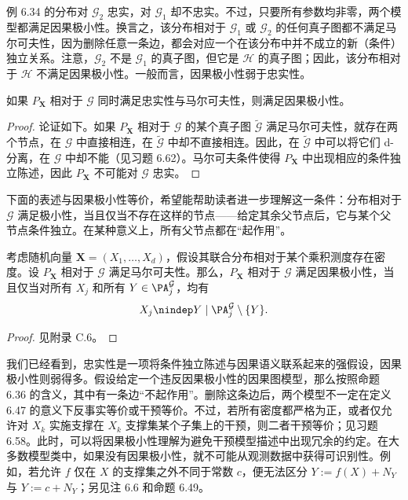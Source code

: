 例 6.34 的分布对 $\mathcal G_2$ 忠实，对 $\mathcal G_1$ 却不忠实。不过，只要所有参数均非零，两个模型都满足因果极小性。换言之，该分布相对于 $\mathcal G_1$ 或 $\mathcal G_2$ 的任何真子图都不满足马尔可夫性，因为删除任意一条边，都会对应一个在该分布中并不成立的新（条件）独立关系。注意，$\mathcal G_2$ 不是 $\mathcal G_1$ 的真子图，但它是 $\mathcal H$ 的真子图；因此，该分布相对于 $\mathcal H$ 不满足因果极小性。一般而言，因果极小性弱于忠实性。

\begin{proposition}[忠实性蕴含因果极小性]
如果 $P_{\mathbf X}$ 相对于 $\mathcal G$ 同时满足忠实性与马尔可夫性，则满足因果极小性。
\end{proposition}
\begin{proof}
论证如下。如果 $P_{\mathbf X}$ 相对于 $\mathcal G$ 的某个真子图 $\widetilde{\mathcal G}$ 满足马尔可夫性，就存在两个节点，在 $\mathcal G$ 中直接相连，在 $\widetilde{\mathcal G}$ 中却不直接相连。因此，在 $\widetilde{\mathcal G}$ 中可以将它们 d-分离，在 $\mathcal G$ 中却不能（见习题 6.62）。马尔可夫条件使得 $P_{\mathbf X}$ 中出现相应的条件独立陈述，因此 $P_{\mathbf X}$ 不可能对 $\mathcal G$ 忠实。
\end{proof}

下面的表述与因果极小性等价，希望能帮助读者进一步理解这一条件：分布相对于 $\mathcal G$ 满足极小性，当且仅当不存在这样的节点——给定其余父节点后，它与某个父节点条件独立。在某种意义上，所有父节点都在“起作用”。

\begin{proposition}[因果极小性的等价表述]
考虑随机向量 $\mathbf X=(X_1,\ldots,X_d)$，假设其联合分布相对于某个乘积测度存在密度。设 $P_{\mathbf X}$ 相对于 $\mathcal G$ 满足马尔可夫性。那么，$P_{\mathbf X}$ 相对于 $\mathcal G$ 满足因果极小性，当且仅当对所有 $X_j$ 和所有 $Y\in\PA_j^{\mathcal G}$，均有
\[
 X_j\nindep Y\mid\PA_j^{\mathcal G}\setminus\{Y\}.
\]
\end{proposition}
\begin{proof}
见附录 C.6。
\end{proof}

我们已经看到，忠实性是一项将条件独立陈述与因果语义联系起来的强假设，因果极小性则弱得多。假设给定一个违反因果极小性的因果图模型，那么按照命题 6.36 的含义，其中有一条边“不起作用”。删除这条边后，两个模型不一定在定义 6.47 的意义下反事实等价或干预等价。不过，若所有密度都严格为正，或者仅允许对 $X_k$ 实施支撑在 $X_k$ 支撑集某个子集上的干预，则二者干预等价；见习题 6.58。此时，可以将因果极小性理解为避免干预模型描述中出现冗余的约定。在大多数模型类中，如果没有因果极小性，就不可能从观测数据中获得可识别性。例如，若允许 $f$ 仅在 $X$ 的支撑集之外不同于常数 $c$，便无法区分 $Y:=f(X)+N_Y$ 与 $Y:=c+N_Y$；另见注 6.6 和命题 6.49。
\FloatBarrier
